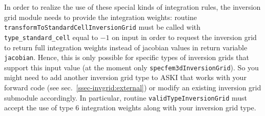\documentclass[12pt,a4paper]{article}
\newcommand{\lcode}[1]{\nolinkurl{#1}}
\newcommand{\ASKI}{ {\ttfamily ASKI} }
\begin{document}
In order to realize the use of these special kinds of integration rules, the inversion grid module needs to provide the
integration weights: routine \lcode{transformToStandardCellInversionGrid} must be called with 
\lcode{type_standard_cell} equal to $-1$ on input in order to request the inversion grid to return full 
integration weights instead of jacobian values in return variable \lcode{jacobian}.
Hence, this is only possible for specific types of inversion grids that support this input value (at the moment 
only \lcode{specfem3dInversionGrid}). So you might need to add another inversion grid type to \ASKI{} that works 
with your forward code (see sec.~\ref{ssec-invgrid:external}{}) or modify an existing inversion grid submodule 
accordingly. In particular, routine \lcode{validTypeInversionGrid} must accept the use of type 6 integration 
weights along with your inversion grid type.

\end{document}
